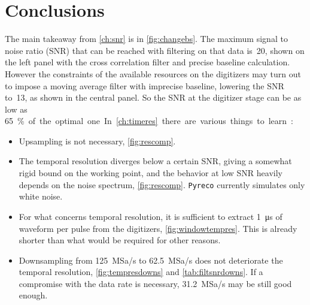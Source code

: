 \chapter{Conclusions}
\label{ch:end}


The main takeaway from \autoref{ch:snr} is in \autoref{fig:changebs}. The
maximum signal to noise ratio (SNR) that can be reached with filtering on that
data is~20, shown on the left panel with the cross correlation filter and
precise baseline calculation. However the constraints of the available
resources on the digitizers may turn out to impose a moving average filter with
imprecise baseline, lowering the SNR to~13, as shown in the central panel. So
the SNR at the digitizer stage can be as low as \SI{65}\% of the optimal one.

In \autoref{ch:timeres} there are various things to learn:

\begin{itemize}
    
    \item Upsampling is not necessary, \autoref{fig:rescomp}.
    
    \item The temporal resolution diverges below a certain SNR, giving a
    somewhat rigid bound on the working point, and the behavior at low SNR
    heavily depends on the noise spectrum, \autoref{fig:rescomp}.
    \texttt{Pyreco} currently simulates only white noise.
    
    \item For what concerns temporal resolution, it is sufficient to extract
    \SI{1}{\micro s} of waveform per pulse from the digitizers,
    \autoref{fig:windowtempres}. This is already shorter than what would be
    required for other reasons.
    
    \item Downsampling from \SI{125}{MSa/s} to \SI{62.5}{MSa/s} does not
    deteriorate the temporal resolution, \autoref{fig:tempresdowns} and
    \autoref{tab:filtsnrdowns}. If a compromise with the data rate is
    necessary, \SI{31.2}{MSa/s} may be still good enough.
    
\end{itemize}

